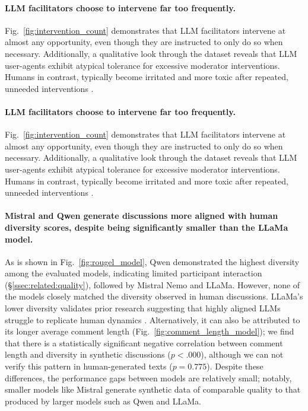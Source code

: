 \paragraph{\ac{LLM} facilitators choose to intervene far too frequently.} Fig.~\ref{fig:intervention_count} demonstrates that \ac{LLM} facilitators intervene at almost any opportunity, even though they are instructed to only do so when necessary. Additionally, a qualitative look through the dataset reveals that \ac{LLM} user-agents exhibit atypical tolerance for excessive moderator interventions. Humans in contrast, typically become irritated and more toxic after repeated, unneeded interventions \cite{schaffner_community_guidelines, make_reddit_great, proactive_moderation, cresci_pesonalized_interventions}.
\paragraph{\ac{LLM} facilitators choose to intervene far too frequently.} Fig.~\ref{fig:intervention_count} demonstrates that \ac{LLM} facilitators intervene at almost any opportunity, even though they are instructed to only do so when necessary. Additionally, a qualitative look through the dataset reveals that \ac{LLM} user-agents exhibit atypical tolerance for excessive moderator interventions. Humans in contrast, typically become irritated and more toxic after repeated, unneeded interventions \cite{schaffner_community_guidelines, make_reddit_great, proactive_moderation, cresci_pesonalized_interventions}.

\paragraph{Mistral and Qwen generate discussions more aligned with human diversity scores, despite being significantly smaller than the LLaMa model.} As is shown in Fig.~\ref{fig:rougel_model}, Qwen demonstrated the highest diversity among the evaluated models, indicating limited participant interaction (\S\ref{ssec:related:quality}), followed by Mistral Nemo and LLaMa. However, none of the models closely matched the diversity observed in human discussions. 
LLaMa's lower diversity validates prior research suggesting that highly aligned \acp{LLM} struggle to replicate human dynamics \cite{Park2023GenerativeAI, leng_2024}. Alternatively, it can also be attributed to its longer average comment length (Fig.~\ref{fig:comment_length_model}); we find that there is a statistically significant negative correlation between comment length and diversity in synthetic discussions ($p < .000$), although we can not verify this pattern in human-generated texts ($p = 0.775$). Despite these differences, the performance gaps between models are relatively small; notably, smaller models like Mistral generate synthetic data of comparable quality to that produced by larger models such as Qwen and LLaMa.

